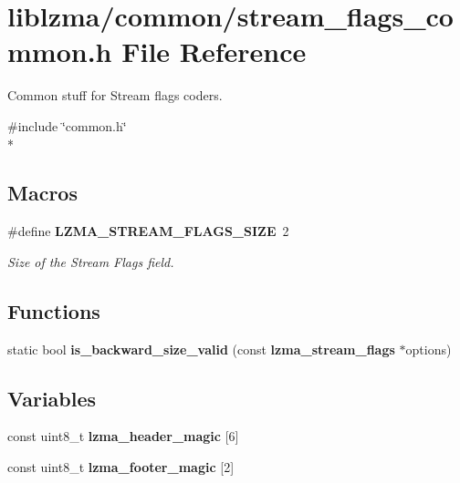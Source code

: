 \section{liblzma/common/stream\-\_\-flags\-\_\-common.h File Reference}
\label{stream__flags__common_8h}


Common stuff for Stream flags coders.  


{\ttfamily \#include \char`\"{}common.\-h\char`\"{}}\\*
\subsection*{Macros}
\begin{DoxyCompactItemize}
\item 
\#define {\bf L\-Z\-M\-A\-\_\-\-S\-T\-R\-E\-A\-M\-\_\-\-F\-L\-A\-G\-S\-\_\-\-S\-I\-Z\-E}~2
\begin{DoxyCompactList}\small\item\em Size of the Stream Flags field. \end{DoxyCompactList}\end{DoxyCompactItemize}
\subsection*{Functions}
\begin{DoxyCompactItemize}
\item 
static bool {\bfseries is\-\_\-backward\-\_\-size\-\_\-valid} (const {\bf lzma\-\_\-stream\-\_\-flags} $\ast$options)\label{stream__flags__common_8h_a8bb1747bfa005f63f00ab2f576464117}

\end{DoxyCompactItemize}
\subsection*{Variables}
\begin{DoxyCompactItemize}
\item 
const uint8\-\_\-t {\bfseries lzma\-\_\-header\-\_\-magic} [6]\label{stream__flags__common_8h_a1ae7a722e96e0a5ccc0a7e4dab78ecb7}

\item 
const uint8\-\_\-t {\bfseries lzma\-\_\-footer\-\_\-magic} [2]\label{stream__flags__common_8h_a8c7c559062ae632559191a1ecd1f754b}

\end{DoxyCompactItemize}


